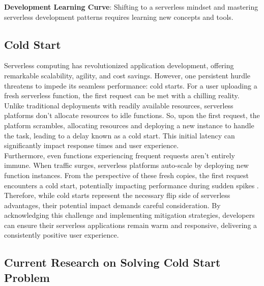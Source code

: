 \textbf{Development Learning Curve}: Shifting to a serverless mindset and mastering serverless development patterns requires learning new concepts and tools.\\

\subsection{Cold Start}

Serverless computing has revolutionized application development, offering remarkable scalability, agility, and cost savings. However, one persistent hurdle threatens to impede its seamless performance: cold starts. For a user uploading a fresh serverless function, the first request can be met with a chilling reality. Unlike traditional deployments with readily available resources, serverless platforms don't allocate resources to idle functions. So, upon the first request, the platform scrambles, allocating resources and deploying a new instance to handle the task, leading to a delay known as a cold start. This initial latency can significantly impact response times and user experience\cite{LYYO21}.\\

Furthermore, even functions experiencing frequent requests aren't entirely immune. When traffic surges, serverless platforms auto-scale by deploying new function instances. From the perspective of these fresh copies, the first request encounters a cold start, potentially impacting performance during sudden spikes \cite{LYYO21}.\\

Therefore, while cold starts represent the necessary flip side of serverless advantages, their potential impact demands careful consideration. By acknowledging this challenge and implementing mitigation strategies, developers can ensure their serverless applications remain warm and responsive, delivering a consistently positive user experience.

\subsection{Current Research on Solving Cold Start Problem}







